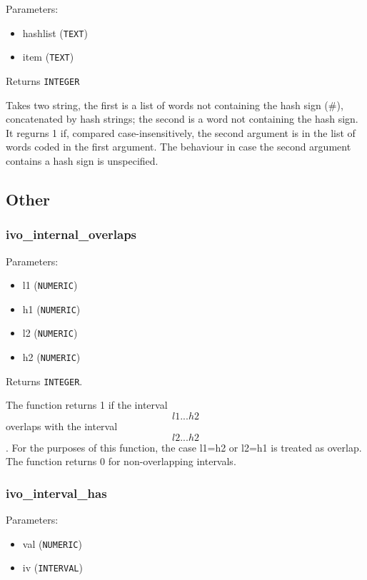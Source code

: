 \documentclass[11pt,a4paper]{ivoa}
\begin{document}
Parameters:

\begin{itemize}
	\item hashlist (\texttt{TEXT})
	\item item (\texttt{TEXT})
\end{itemize}

Returns \texttt{INTEGER}

Takes two string, the first is a list of words not containing the hash
sign (\#), concatenated by hash strings; the second is a word not
containing the hash sign. It regurns 1 if, compared case-insensitively,
the second argument is in the list of words coded in the first argument.
The behaviour in case the second argument contains a hash sign is
unspecified.

\subsection{Other}

\subsubsection{ivo\_internal\_overlaps}

Parameters:

\begin{itemize}
	\item l1 (\texttt{NUMERIC})
	\item h1 (\texttt{NUMERIC})
	\item l2 (\texttt{NUMERIC})
	\item h2 (\texttt{NUMERIC})
\end{itemize}

Returns \texttt{INTEGER}.

The function returns 1 if the interval \[l1...h2\] overlaps with the
interval \[l2...h2\]. For the purposes of this function, the case l1=h2 or
l2=h1 is treated as overlap. The function returns 0 for non-overlapping
intervals.

\subsubsection{ivo\_interval\_has}

Parameters:

\begin{itemize}
	\item val (\texttt{NUMERIC})
	\item iv (\texttt{INTERVAL})
\end{itemize}
\end{document}

